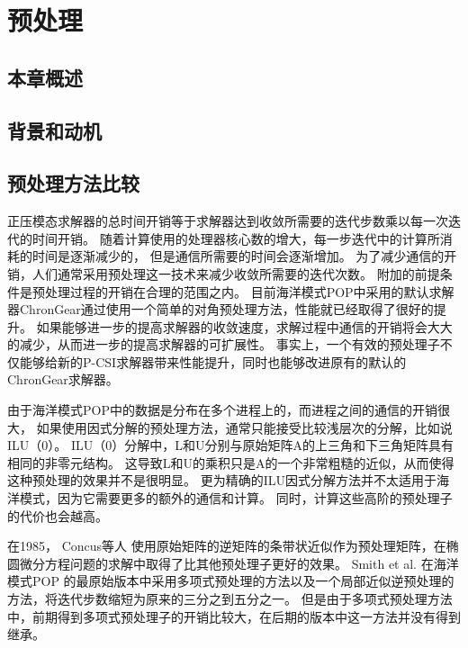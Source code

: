 \chapter{预处理}
\label{cha:precond}

\section{本章概述}

\section{背景和动机}
\label{precond:precondBackgroud}

\section{预处理方法比较}
\label{precond:compare}
正压模态求解器的总时间开销等于求解器达到收敛所需要的迭代步数乘以每一次迭代的时间开销。
随着计算使用的处理器核心数的增大，每一步迭代中的计算所消耗的时间是逐渐减少的，
但是通信所需要的时间会逐渐增加。 
为了减少通信的开销，人们通常采用预处理这一技术来减少收敛所需要的迭代次数。
附加的前提条件是预处理过程的开销在合理的范围之内。 
目前海洋模式POP中采用的默认求解器ChronGear通过使用一个简单的对角预处理方法，性能就已经取得了很好的提升\cite{pini1990simple, reddy2013comparison}。 
如果能够进一步的提高求解器的收敛速度，求解过程中通信的开销将会大大的减少，从而进一步的提高求解器的可扩展性。
事实上，一个有效的预处理子不仅能够给新的P-CSI求解器带来性能提升，同时也能够改进原有的默认的ChronGear求解器。

由于海洋模式POP中的数据是分布在多个进程上的，而进程之间的通信的开销很大， 如果使用因式分解的预处理方法，通常只能接受比较浅层次的分解，比如说ILU（0）。 
ILU（0）分解中，L和U分别与原始矩阵A的上三角和下三角矩阵具有相同的非零元结构。
这导致L和U的乘积只是A的一个非常粗糙的近似，从而使得这种预处理的效果并不是很明显。 
更为精确的ILU因式分解方法并不太适用于海洋模式，因为它需要更多的额外的通信和计算。 
同时，计算这些高阶的预处理子的代价也会越高。 

在1985， Concus等人 \cite{concus1985block} 使用原始矩阵的逆矩阵的条带状近似作为预处理矩阵，在椭圆微分方程问题的求解中取得了比其他预处理子更好的效果。 
Smith et al. \cite{smith1992parallel}在海洋模式POP 的最原始版本中采用多项式预处理的方法以及一个局部近似逆预处理的方法，将迭代步数缩短为原来的三分之到五分之一。
但是由于多项式预处理方法中，前期得到多项式预处理子的开销比较大，在后期的版本中这一方法并没有得到继承。  


